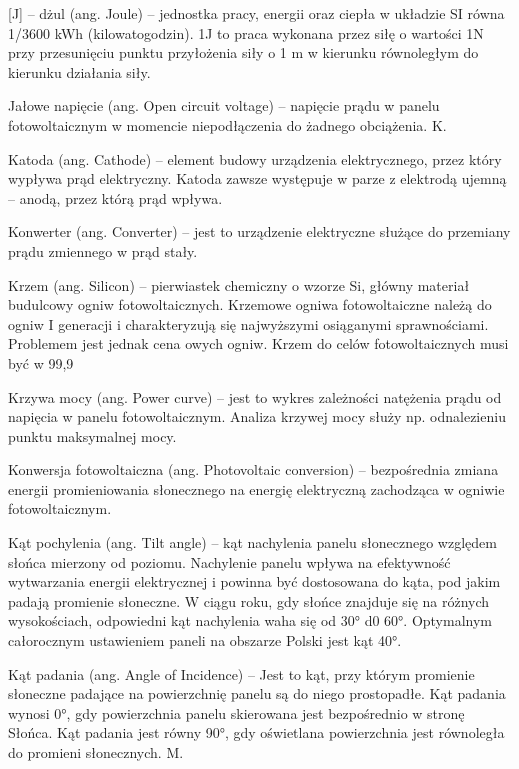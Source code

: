 \documentclass[12pt,a4paper]{article}
\begin{document}
[J] – dżul (ang. Joule) – jednostka pracy, energii oraz ciepła w układzie SI równa 1/3600 kWh (kilowatogodzin). 1J to praca wykonana przez siłę o wartości 1N przy przesunięciu punktu przyłożenia siły o 1 m w kierunku równoległym do kierunku działania siły.

Jałowe napięcie (ang. Open circuit voltage) – napięcie prądu w panelu fotowoltaicznym w momencie niepodłączenia do żadnego obciążenia.
K.

Katoda (ang. Cathode) – element budowy urządzenia elektrycznego, przez który wypływa prąd elektryczny. Katoda zawsze występuje w parze z elektrodą ujemną – anodą, przez którą prąd wpływa.

Konwerter (ang. Converter) – jest to urządzenie elektryczne służące do przemiany prądu zmiennego w prąd stały.

Krzem (ang. Silicon) – pierwiastek chemiczny o wzorze Si, główny materiał budulcowy ogniw fotowoltaicznych.  Krzemowe ogniwa fotowoltaiczne należą do ogniw I generacji i charakteryzują się najwyższymi osiąganymi sprawnościami. Problemem jest jednak cena owych ogniw. Krzem do celów fotowoltaicznych musi być w 99,9%

Krzywa mocy (ang. Power curve) – jest to wykres zależności natężenia prądu od napięcia w panelu fotowoltaicznym. Analiza krzywej mocy służy np. odnalezieniu punktu maksymalnej mocy.

Konwersja fotowoltaiczna (ang. Photovoltaic conversion) – bezpośrednia zmiana energii promieniowania słonecznego na energię elektryczną zachodząca w ogniwie fotowoltaicznym.

Kąt pochylenia (ang. Tilt angle) – kąt nachylenia panelu słonecznego względem słońca mierzony od poziomu. Nachylenie panelu wpływa na efektywność wytwarzania energii elektrycznej i powinna być dostosowana do kąta, pod jakim padają promienie słoneczne. W ciągu roku, gdy słońce znajduje się na różnych wysokościach, odpowiedni kąt nachylenia waha się od 30° d0 60°. Optymalnym całorocznym ustawieniem paneli na obszarze Polski jest kąt 40°.

Kąt padania (ang. Angle of Incidence) – Jest to kąt, przy którym promienie słoneczne padające na powierzchnię panelu są do niego prostopadłe. Kąt padania wynosi 0°, gdy powierzchnia panelu skierowana jest bezpośrednio w stronę Słońca. Kąt padania jest równy 90°, gdy oświetlana powierzchnia jest równoległa do promieni słonecznych.
M.
\end{document}
